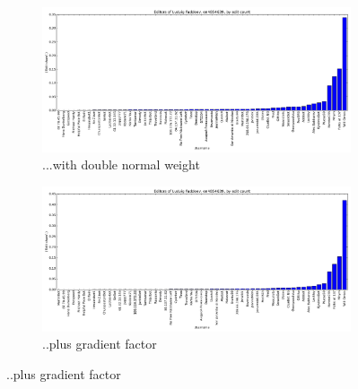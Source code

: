 \begin{figure}[H]
  \ContinuedFloat  
  \centering
  \begin{subfigure}[b]{0.7\linewidth}
    \centering
    \includegraphics[width=\linewidth]{img/weightings/LudvigFaddeevNormal.png}
    \caption{...with double normal weight}
  \end{subfigure}
  \begin{subfigure}[b]{0.7\linewidth}
    \centering
    \includegraphics[width=\linewidth]{img/weightings/LudvigFaddeevNormalGradient.png}
    \caption{..plus gradient factor}
  \end{subfigure}
  

\end{figure}
